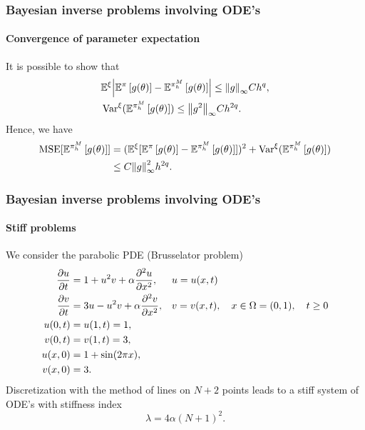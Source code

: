 \documentclass{beamer}
\newcommand{\E}{\mathbb{E}}
\newcommand{\MSE}{\operatorname{MSE}}
\newcommand{\Var}{\operatorname{Var}}
\begin{document}
\begin{frame}
	\frametitle{Bayesian inverse problems involving ODE's}
	\framesubtitle{Convergence of parameter expectation}	
	
	It is possible to show that
	\begin{equation*}
	\begin{aligned}
		&\E^\xi\abs{\E^\pi\left[g(\theta)\right] - \E^{\pi_h^M}\left[g(\theta)\right]} \leq \norm{g}_\infty C h^{q}, \\
		&\Var^\xi (\E^{\pi_h^M}\left[g(\theta)\right]) \leq  \norm{g^2}_\infty C h^{2q}.
	\end{aligned}
	\end{equation*}
	Hence, we have
	\begin{equation*}
	\begin{aligned}
		\MSE[\E^{\pi_h^M}\left[g(\theta)\right]] &= (\E^\xi[\E^\pi\left[g(\theta)\right] - \E^{\pi_h^M}\left[g(\theta)\right]])^2 + \Var^\xi (\E^{\pi_h^M}\left[g(\theta)\right]) \\
		&\leq C \norm{g}_\infty^2 h^{2q}.
	\end{aligned}
	\end{equation*}
\end{frame}

\begin{frame}
	\frametitle{Bayesian inverse problems involving ODE's}
	\framesubtitle{Stiff problems}
	
	We consider the parabolic PDE (Brusselator problem)
	\begin{equation*}
	\begin{aligned}
		\pdv{u}{t} &= 1 + u^2v + \alpha \pdv[2]{u}{x}, && u = u(x, t)\\
		\pdv{v}{t} &= 3u - u^2v + \alpha \pdv[2]{v}{x}, && v = v(x, t), \quad x \in \Omega = (0, 1), \quad t \geq 0 \\
		u(0, t) &= u(1, t) = 1, \\
		v(0, t) &= v(1, t) = 3, \\
		u(x, 0) &= 1 + \sin(2\pi x), \\
		v(x, 0) &= 3.
	\end{aligned}
	\end{equation*}
	Discretization with the method of lines on $N+2$ points leads to a stiff system of ODE's with stiffness index 
	\begin{equation*}
		\lambda = 4 \alpha (N+1)^2.
	\end{equation*}
\end{frame}
\end{document}
